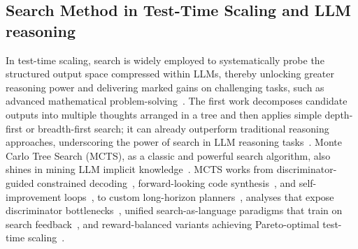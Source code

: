 \documentclass[11pt]{article}
\theoremstyle{definition}
\theoremstyle{remark}
\begin{document}
\subsection{Search Method in Test-Time Scaling and LLM reasoning}
In test-time scaling, search is widely employed to systematically probe the structured output space compressed within LLMs, thereby unlocking greater reasoning power and delivering marked gains on challenging tasks, such as advanced mathematical problem-solving~\citep{zhang2025survey, li2025system}. The first work decomposes candidate outputs into multiple thoughts arranged in a tree and then applies simple depth-first or breadth-first search; it can already outperform traditional reasoning approaches, underscoring the power of search in LLM reasoning tasks~\citep{yao2023tree}. Monte Carlo Tree Search (MCTS), as a classic and powerful search algorithm, also shines in mining LLM implicit knowledge~\citep{swiechowski2023monte}. MCTS works from discriminator-guided constrained decoding~\citep{chaffin-etal-2022-ppl}, forward-looking code synthesis~\citep{zhang2023planning}, and self-improvement loops~\citep{tian2024toward}, to custom long-horizon planners~\citep{wan2024alphazerolike}, analyses that expose discriminator bottlenecks~\citep{chen-etal-2024-tree}, unified search-as-language paradigms that train on search feedback~\citep{gandhistream}, and reward-balanced variants achieving Pareto-optimal test-time scaling~\citep{wu2025inference}.
\end{document}
